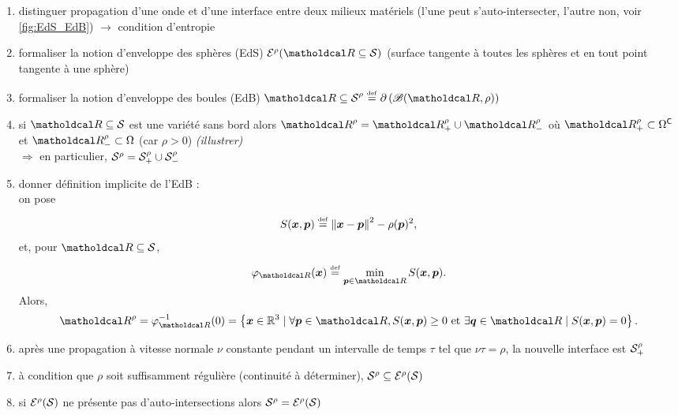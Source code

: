\par\bigskip
\begin{enumerate}
	\item distinguer propagation d'une onde et d'une interface entre deux milieux matériels (l'une peut s'auto-intersecter, l'autre non, voir \autoref{fig:EdS_EdB}) $\to$ condition d'entropie
	\item formaliser la notion d'enveloppe des sphères (EdS) $\EdS{\region \subseteq \interface}{\rho}$ (surface tangente à toutes les sphères et en tout point tangente à une sphère)
	\item formaliser la notion d'enveloppe des boules (EdB) $\EdB{\region \subseteq \interface}{\rho} \defini{=} \boundary{ \left( \ball{\region}{\rho} \right) }$
	\item si $\region \subseteq \interface$ est une variété sans bord alors $\EdB{\region}{\rho}  = \EdBplus{\region}{\rho} \cup \EdBmoins{\region}{\rho}$ où $\EdBplus{\region}{\rho} \subset \complement{\solide}$ et $\EdBmoins{\region}{\rho} \subset \solide$ (car $\rho > 0$) \textit{(illustrer)}\\
	$\Rightarrow$ en particulier, ${\mathcal{S}}^{\rho}  = {\mathcal{S}}_{+}^{\rho} \cup {\ensuremath{\mathcal{S}}}_{-}^{\rho}$
	
	
	\item donner définition implicite de l'EdB :\\
	on pose 
	\[
		S(\bm{x}, \bm{p}) \overset{\underset{\mathrm{def}}{}}{=} \left\| {\bm{x} - \bm{p}} \right\|^2 - \rho(\bm{p})^2,
	\]
	et, pour $\region \subseteq \interface$, 
	\[
		\implicitEdB{\region}(\bx) \defini{=} \min_{\p \in \region} \implicitsphere(\bx, \p).
	\]
	Alors,
	\[ 
		\EdB{\region}{\rho} 
		= \implicitEdB{\region}^{-1}(0)
		= 
		\left\{
			\bx \in \reals^3 \mid \forall \p \in \region, \implicitsphere(\bx, \p) \geq 0
			\text{ et } \exists \q \in \region \mid \implicitsphere(\bx, \p) = 0
		\right\}.
	\]
	\item après une propagation à vitesse normale $\nu$ constante pendant un intervalle de temps $\tau$ tel que $\nu \tau = \rho$, la nouvelle interface est ${\mathcal{S}}_{+}^{\rho}$
	\item à condition que $\rho$ soit suffisamment régulière (continuité à déterminer), ${\mathcal{S}}^{\rho} \subseteq {\mathcal{E}}^{\rho}({\mathcal{S}})$
	\item si ${\mathcal{E}}^{\rho}({\mathcal{S}})$ ne présente pas d'auto-intersections alors ${\mathcal{S}}^{\rho} = {\mathcal{E}}^{\rho}({\mathcal{S}})$
\end{enumerate}


